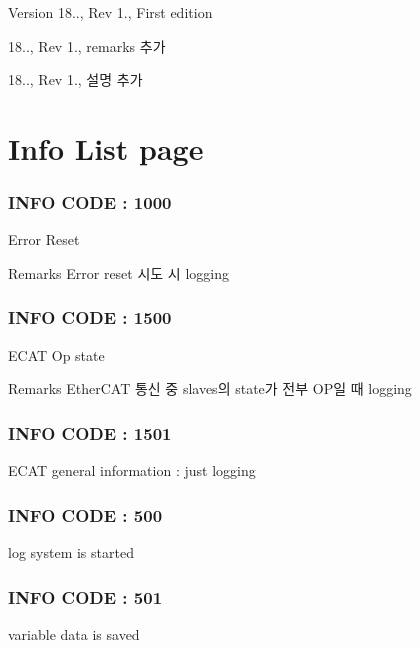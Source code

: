 \begin{DoxyVersion}{Version}
18.., Rev 1., First edition 

18.., Rev 1., remarks 추가 

18.., Rev 1., 설명 추가
\end{DoxyVersion}
\section*{Info List page }



 \subsubsection*{I\-N\-F\-O C\-O\-D\-E \-: 1000 }

Error Reset \begin{DoxyRemark}{Remarks}
Error reset 시도 시 logging
\end{DoxyRemark}


 \subsubsection*{I\-N\-F\-O C\-O\-D\-E \-: 1500 }

E\-C\-A\-T Op state \begin{DoxyRemark}{Remarks}
Ether\-C\-A\-T 통신 중 slaves의 state가 전부 O\-P일 때 logging
\end{DoxyRemark}


 \subsubsection*{I\-N\-F\-O C\-O\-D\-E \-: 1501 }

E\-C\-A\-T general information \-: just logging



 \subsubsection*{I\-N\-F\-O C\-O\-D\-E \-: 500 }

log system is started



 \subsubsection*{I\-N\-F\-O C\-O\-D\-E \-: 501 }

variable data is saved



